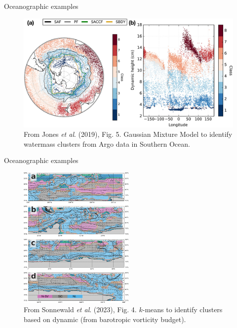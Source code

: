 \documentclass[xcolor=x11names,compress]{beamer}
\renewcommand{\(}{\begin{columns}}
\renewcommand{\)}{\end{columns}}
\newcommand{\<}[1]{\begin{column}{#1}}
\renewcommand{\>}{\end{column}}
\begin{document}

\begin{frame}{Oceanographic examples}

\begin{figure}
  \includegraphics[width=\textwidth]{Jones_et_al_2019_fig5}
  \caption{From Jones \emph{et al}. (2019), Fig. 5. Gaussian Mixture Model to
  identify watermass clusters from Argo data in Southern Ocean.}
\end{figure}

\end{frame}


\begin{frame}{Oceanographic examples}

\begin{figure}
  \includegraphics[width=0.5\textwidth]{Sonnewald_et_al_2023_fig4}
  \caption{From Sonnewald \emph{et al}. (2023), Fig. 4. $k$-means to identify
  clusters based on dynamic (from barotropic vorticity budget).}
\end{figure}

\end{frame}
\end{document}
